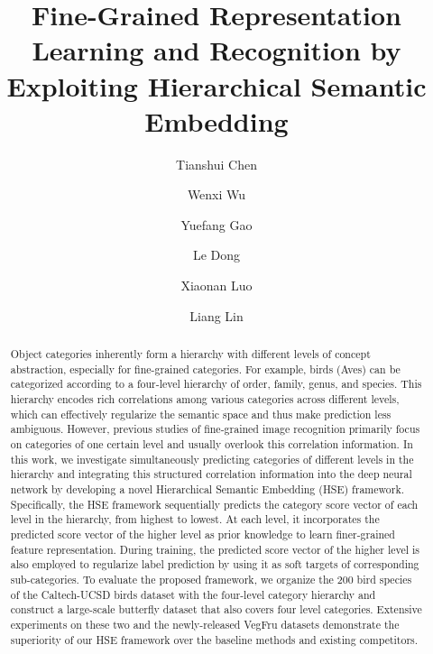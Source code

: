 \documentclass[sigconf]{acmart}
\begin{document}
\title{Fine-Grained Representation Learning and Recognition by \\ Exploiting Hierarchical Semantic Embedding}



\author{Tianshui Chen}

\author{Wenxi Wu}

\author{Yuefang Gao}

\author{Le Dong}

\author{Xiaonan Luo}

\author{Liang Lin}


\begin{abstract}
Object categories inherently form a hierarchy with different levels of concept abstraction, especially for fine-grained categories. For example, birds (Aves) can be categorized according to a four-level hierarchy of order, family, genus, and species. This hierarchy encodes rich correlations among various categories across different levels, which can effectively regularize the semantic space and thus make prediction less ambiguous. However, previous studies of fine-grained image recognition primarily focus on categories of one certain level and usually overlook this correlation information. In this work, we investigate simultaneously predicting categories of different levels in the hierarchy and integrating this structured correlation information into the deep neural network by developing a novel Hierarchical Semantic Embedding (HSE) framework. Specifically, the HSE framework sequentially predicts the category score vector of each level in the hierarchy, from highest to lowest. At each level, it incorporates the predicted score vector of the higher level as prior knowledge to learn finer-grained feature representation. During training, the predicted score vector of the higher level is also employed to regularize label prediction by using it as soft targets of corresponding sub-categories. To evaluate the proposed framework, we organize the 200 bird species of the Caltech-UCSD birds dataset with the four-level category hierarchy and construct a large-scale butterfly dataset that also covers four level categories. Extensive experiments on these two and the newly-released VegFru datasets demonstrate the superiority of our HSE framework over the baseline methods and existing competitors. 
\end{abstract}
\end{document}
